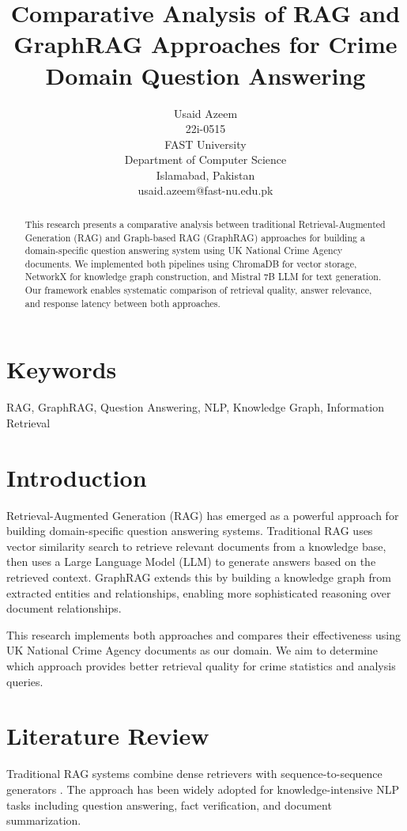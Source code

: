 \documentclass[a4paper,12pt]{article}
\title{Comparative Analysis of RAG and GraphRAG Approaches for Crime Domain Question Answering}
\author{Usaid Azeem\\22i-0515\\FAST University\\Department of Computer Science\\Islamabad, Pakistan\\usaid.azeem@fast-nu.edu.pk}
\begin{document}
\maketitle

\begin{abstract}
This research presents a comparative analysis between traditional Retrieval-Augmented Generation (RAG) and Graph-based RAG (GraphRAG) approaches for building a domain-specific question answering system using UK National Crime Agency documents. We implemented both pipelines using ChromaDB for vector storage, NetworkX for knowledge graph construction, and Mistral 7B LLM for text generation. Our framework enables systematic comparison of retrieval quality, answer relevance, and response latency between both approaches.
\end{abstract}

\section{Keywords}
RAG, GraphRAG, Question Answering, NLP, Knowledge Graph, Information Retrieval

\section{Introduction}
Retrieval-Augmented Generation (RAG) has emerged as a powerful approach for building domain-specific question answering systems. Traditional RAG uses vector similarity search to retrieve relevant documents from a knowledge base, then uses a Large Language Model (LLM) to generate answers based on the retrieved context. GraphRAG extends this by building a knowledge graph from extracted entities and relationships, enabling more sophisticated reasoning over document relationships.

This research implements both approaches and compares their effectiveness using UK National Crime Agency documents as our domain. We aim to determine which approach provides better retrieval quality for crime statistics and analysis queries.

\section{Literature Review}
Traditional RAG systems combine dense retrievers with sequence-to-sequence generators \cite{lewis2020}. The approach has been widely adopted for knowledge-intensive NLP tasks including question answering, fact verification, and document summarization.
\end{document}
